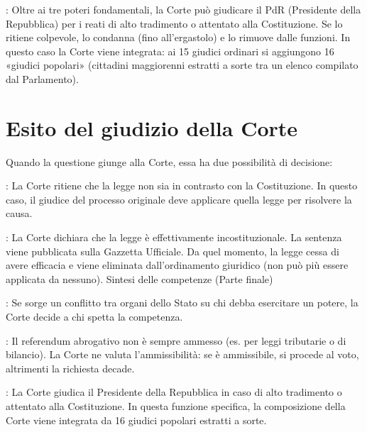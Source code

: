 \documentclass[letterpaper,10pt,italian]{sphinxmanual}
\begin{document}
\sphinxAtStartPar
{}: Oltre ai tre poteri fondamentali, la Corte può giudicare il PdR (Presidente della Repubblica)
per i reati di alto tradimento o attentato alla Costituzione.
Se lo ritiene colpevole, lo condanna (fino all’ergastolo) e lo rimuove dalle funzioni.
In questo caso la Corte viene integrata: ai 15 giudici ordinari si aggiungono 16 «giudici popolari» (cittadini maggiorenni estratti a sorte tra un elenco compilato dal Parlamento).

\sphinxstepscope


\chapter{Esito del giudizio della Corte}
\label{\detokenize{Esito del giudizio della Corte:esito-del-giudizio-della-corte}}\label{\detokenize{Esito del giudizio della Corte::doc}}
\sphinxAtStartPar
Quando la questione giunge alla Corte, essa ha due possibilità di decisione:

\sphinxAtStartPar
{}: La Corte ritiene che la legge non sia in contrasto con la Costituzione.
In questo caso, il giudice del processo originale deve applicare quella legge per risolvere la causa.

\sphinxAtStartPar
{}: La Corte dichiara che la legge è effettivamente incostituzionale.
La sentenza viene pubblicata sulla Gazzetta Ufficiale.
Da quel momento, la legge cessa di avere efficacia e viene eliminata dall’ordinamento giuridico (non può più essere applicata da nessuno).
Sintesi delle competenze (Parte finale)

\sphinxAtStartPar
{}: Se sorge un conflitto tra organi dello Stato su chi debba esercitare un potere,
la Corte decide a chi spetta la competenza.

\sphinxAtStartPar
{}: Il referendum abrogativo non è sempre ammesso (es. per leggi tributarie o di bilancio).
La Corte ne valuta l’ammissibilità: se è ammissibile, si procede al voto, altrimenti la richiesta decade.

\sphinxAtStartPar
{}: La Corte giudica il Presidente della Repubblica in caso di alto tradimento o attentato alla Costituzione. In questa funzione specifica, la composizione della Corte viene integrata da 16 giudici popolari estratti a sorte.

\sphinxstepscope
\end{document}
